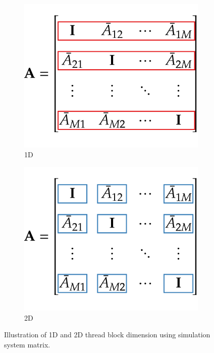 \begin{figure}[!htbp]
  \centering
  \begin{subfigure}[h]{0.33\textwidth}
    \centering
    \includegraphics[width=\textwidth]{img/thread_block1D.pdf}
    \caption{1D}\label{fig:thread_block_1D}
  \end{subfigure}
  \begin{subfigure}[h]{0.33\textwidth}
    \centering
    \includegraphics[width=\textwidth]{img/thread_block2D.pdf}
    \caption{2D}\label{fig:thread_block_2D}
  \end{subfigure}
  \caption{Illustration of 1D and 2D thread block dimension using simulation system matrix.}
  \label{fig:thread_block}
\end{figure}

